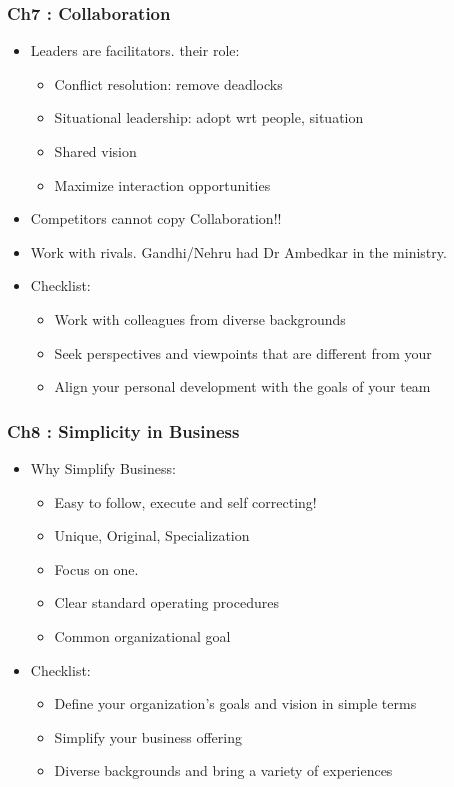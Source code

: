 \begin{frame}[fragile]\frametitle{Ch7 : Collaboration}

\begin{itemize}
\item Leaders are facilitators. their role:
	\begin{itemize}
	\item Conflict resolution: remove deadlocks
	\item Situational leadership: adopt wrt people, situation
	\item Shared vision
	\item Maximize interaction opportunities
	\end{itemize}
\item Competitors cannot copy Collaboration!!
\item Work with rivals. Gandhi/Nehru had Dr Ambedkar in the ministry.
\item Checklist:
	\begin{itemize}
	\item  Work with colleagues from diverse backgrounds
	\item  Seek perspectives and viewpoints that are different from 
your
\item Align your personal development with the goals of your team
	\end{itemize}
\end{itemize}

\end{frame}

\begin{frame}[fragile]\frametitle{Ch8 : Simplicity in  Business}

\begin{itemize}
\item Why Simplify Business:
	\begin{itemize}
	\item Easy to follow, execute and self correcting!
	\item Unique, Original, Specialization
	\item Focus on one.
	\item Clear  standard operating procedures
	\item Common organizational goal
	\end{itemize}
\item Checklist:
	\begin{itemize}
	\item Define your organization’s goals and vision in simple terms
	\item Simplify your business offering
	\item Diverse backgrounds and bring a variety of experiences
	\end{itemize}
\end{itemize}

\end{frame}


